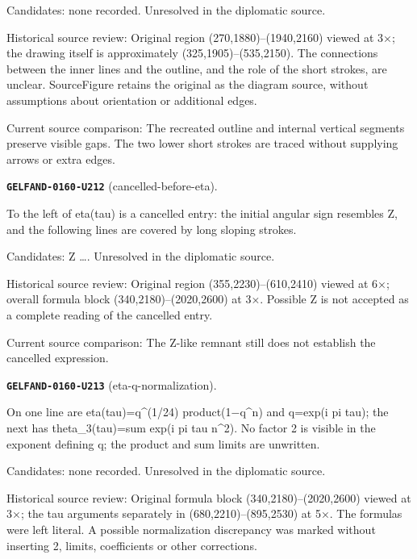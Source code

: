 Candidates: none recorded. Unresolved in the diplomatic source.\par
Historical source review: Original region (270,1880)–(1940,2160) viewed at 3×; the drawing itself is approximately (325,1905)–(535,2150). The connections between the inner lines and the outline, and the role of the short strokes, are unclear. SourceFigure retains the original as the diagram source, without assumptions about orientation or additional edges.\par
Current source comparison: The recreated outline and internal vertical segments preserve visible gaps. The two lower short strokes are traced without supplying arrows or extra edges.\par\medskip
\par\noindent\leavevmode{}\label{GELFAND-0160-U212}\label{GELFAND-P001479:cancelled-before-eta}\textbf{\texttt{GELFAND-0160-U212}} (cancelled-before-eta).\nopagebreak[4]\par
To the left of eta(tau) is a cancelled entry: the initial angular sign resembles Z, and the following lines are covered by long sloping strokes.\par
Candidates: Z …. Unresolved in the diplomatic source.\par
Historical source review: Original region (355,2230)–(610,2410) viewed at 6×; overall formula block (340,2180)–(2020,2600) at 3×. Possible Z is not accepted as a complete reading of the cancelled entry.\par
Current source comparison: The Z-like remnant still does not establish the cancelled expression.\par\medskip
\par\noindent\leavevmode{}\label{GELFAND-0160-U213}\label{GELFAND-P001479:eta-q-normalization}\textbf{\texttt{GELFAND-0160-U213}} (eta-q-normalization).\nopagebreak[4]\par
On one line are eta(tau)=q\textasciicircum{}(1/24) product(1−q\textasciicircum{}n) and q=exp(i pi tau); the next has theta\_3(tau)=sum exp(i pi tau n\textasciicircum{}2). No factor 2 is visible in the exponent defining q; the product and sum limits are unwritten.\par
Candidates: none recorded. Unresolved in the diplomatic source.\par
Historical source review: Original formula block (340,2180)–(2020,2600) viewed at 3×; the tau arguments separately in (680,2210)–(895,2530) at 5×. The formulas were left literal. A possible normalization discrepancy was marked without inserting 2, limits, coefficients or other corrections.\par
